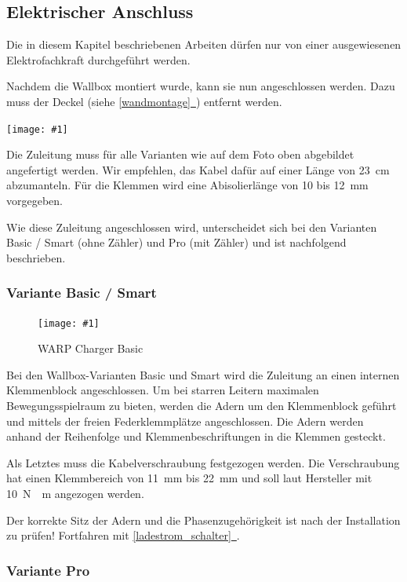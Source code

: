 \documentclass[a4paper,10pt]{article}
\newcommand{\hint}[1]{\begin{tcolorbox}[colback=boxgray,colframe=black,coltext=
white,title=Hinweis,left*=2mm,right*=2mm,boxsep=1mm,bottom=1mm,top=1mm]#1\end{tcolorbox}}
\newcommand{\gfx}[1]{\texttt{[image: \#1]}}
\newcommand*{\fullref}[1]{\hyperref[{#1}]{\ref*{#1}~\nameref*{#1}}}
\begin{document}
\begin{multicols*}{2}
	\newpage
	\subsection{Elektrischer Anschluss}
	\hint{Die in diesem Kapitel beschriebenen Arbeiten dürfen nur von einer ausgewiesenen
		Elektrofachkraft durchgeführt werden.}

	Nachdem die Wallbox montiert wurde, kann sie nun angeschlossen werden. Dazu
	muss der Deckel (siehe \fullref{wandmontage}) entfernt werden.

	\gfx{./img_warp2/resized/warp_cable_cut_ready}

	Die Zuleitung muss für alle Varianten wie auf dem Foto oben abgebildet
	angefertigt werden. Wir empfehlen, das Kabel dafür auf einer Länge von
	\SI{23}{\centi\meter} abzumanteln. Für die Klemmen wird eine
	Abisolierlänge von 10 bis \SI{12}{\milli\meter} vorgegeben.

	Wie diese Zuleitung angeschlossen wird, unterscheidet sich bei
	den Varianten Basic / Smart (ohne Zähler) und Pro (mit Zähler) und ist
	nachfolgend beschrieben.

	\subsubsection{Variante Basic / Smart}

	\begin{figure}[H]
		\gfx{./img_warp2/resized/warp2_basic_top_open}
		\caption*{WARP Charger Basic}
	\end{figure}

	Bei den Wallbox-Varianten Basic und Smart
	wird die Zuleitung an einen internen Klemmenblock
	angeschlossen. Um bei starren Leitern maximalen Bewegungsspielraum zu bieten,
	werden die Adern um den Klemmenblock geführt und mittels der freien
	Federklemmplätze angeschlossen. Die Adern werden anhand der Reihenfolge und
	Klemmenbeschriftungen in die Klemmen gesteckt.

	Als Letztes muss die Kabelverschraubung festgezogen werden. Die Verschraubung
	hat einen Klemmbereich von \SI{11}{\milli\meter} bis \SI{22}{\milli\meter} und soll laut Hersteller mit
	\SI{10}{\newton{}\meter} angezogen werden.

	Der korrekte Sitz der Adern und die Phasenzugehörigkeit ist nach der
	Installation zu prüfen! Fortfahren mit \fullref{ladestrom_schalter}.


	\subsubsection{Variante Pro}


\end{multicols*}
\end{document}
